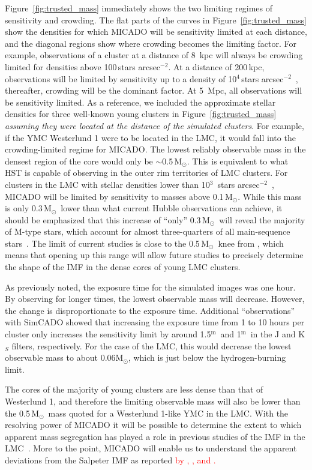 \documentclass[referee]{aa}
\newcommand{\m}{$^\mathrm{m}$~}
\newcommand{\msun}{M$_\odot$~}
\newcommand{\msune}{M$_\odot$}
\newcommand{\s}{$\sim$}
\newcommand{\h}[1]{$^{#1}$}
\newcommand{\spa}{stars arcsec$^{-2}$~}
\newcommand{\spae}{stars arcsec$^{-2}$}
\newcommand{\langedit}[1]{\textcolor{red}{#1}}
\begin{document}
Figure~\ref{fig:trusted_mass} immediately shows the two limiting regimes of sensitivity and crowding.
The flat parts of the curves in Figure~\ref{fig:trusted_mass} show the densities for which MICADO will be sensitivity limited at each distance, and the diagonal regions show where crowding becomes the limiting factor.
For example, observations of a cluster at a distance of 8\, kpc will always be crowding limited for densities above 100\,\spae.
At a distance of 200\,kpc, observations will be limited by sensitivity up to a density of 10\h4\,\spa, thereafter, crowding will be the dominant factor.
At 5\, Mpc, all observations will be sensitivity limited.
As a reference, we included the approximate stellar densities for three well-known young clusters in Figure~\ref{fig:trusted_mass} \textit{\textup{assuming they were located at the distance of the simulated clusters}}.
For example, if the YMC Westerlund 1 were to be located in the LMC, it would fall into the crowding-limited regime for MICADO\@.
The lowest reliably observable mass in the densest region of the core would only be \s0.5\,\msune.
This is equivalent to what HST is capable of observing in the outer rim territories of LMC clusters.
For clusters in the LMC with stellar densities lower than 10\h3~\spa , MICADO will be limited by sensitivity to masses above 0.1\,\msune.
While this mass is only 0.3\,\msun lower than what current Hubble observations can achieve, it should be emphasized that this increase of ``only'' 0.3\,\msun will reveal the majority of M-type stars, which account for almost three-quarters of all main-sequence stars~\citep{ledrew2001}.
The limit of current studies is close to the 0.5\,\msun knee from \citet{kroupa2001}, which means that opening up this range will allow future studies to precisely determine the shape of the IMF in the dense cores of young LMC clusters.

As previously noted, the exposure time for the simulated images was one hour.
By observing for longer times, the lowest observable mass will decrease.
However, the change is disproportionate to the exposure time.
Additional ``observations'' with SimCADO showed that increasing the exposure time from 1 to 10 hours per cluster only increases the sensitivity limit by around 1.5\m and 1\m in the J and K$_S$ filters, respectively.
For the case of the LMC, this would decrease the lowest observable mass to about 0.06\msune, which is just below the hydrogen-burning limit.

The cores of the majority of young clusters are less dense than that of Westerlund 1, and therefore the limiting observable mass will also be lower than the 0.5\,\msun mass quoted for a Westerlund 1-like YMC in the LMC\@.
With the resolving power of MICADO it will be possible to determine the extent to which apparent mass segregation has played a role in previous studies of the IMF in the LMC~\citep{Ascenso2009-de}.
More to the point, MICADO will enable us to understand the apparent deviations from the Salpeter IMF as reported \langedit{by \citet{dario2009}, \citet{geha2013}, and \citet{kalirai2013}.}
\end{document}
